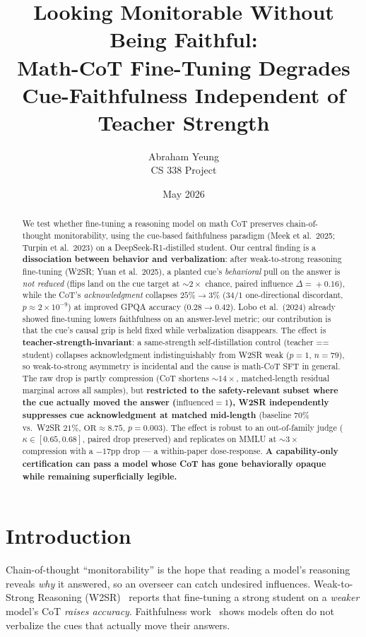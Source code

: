 \documentclass[10pt]{article}
\title{\vspace{-3.5em}Looking Monitorable Without Being Faithful:\\
Math-CoT Fine-Tuning Degrades Cue-Faithfulness Independent of Teacher Strength}
\author{Abraham Yeung \\ \small CS 338 Project}
\date{\vspace{-1em}\small May 2026}
\begin{document}
\maketitle
\vspace{-1.5em}

\begin{abstract}
\noindent
We test whether fine-tuning a reasoning model on math CoT preserves chain-of-thought
monitorability, using the cue-based faithfulness paradigm (Meek et al.\ 2025; Turpin
et al.\ 2023) on a DeepSeek-R1-distilled student. Our central finding is a
\textbf{dissociation between behavior and verbalization}: after weak-to-strong
reasoning fine-tuning (W2SR; Yuan et al.\ 2025), a planted cue's \emph{behavioral}
pull on the answer is \emph{not reduced} (flips land on the cue target at
${\sim}2\times$ chance, paired influence $\Delta\!=\!+0.16$), while the CoT's
\emph{acknowledgment} collapses $25\%\!\to\!3\%$ ($34/1$ one-directional discordant,
$p\!\approx\!2\!\times\!10^{-9}$) at improved GPQA accuracy
($0.28\!\to\!0.42$). Lobo et al.\ (2024) already showed fine-tuning lowers
faithfulness on an answer-level metric; our contribution is that the cue's causal
grip is held fixed while verbalization disappears.
The effect is \textbf{teacher-strength-invariant}: a same-strength
self-distillation control (teacher == student) collapses acknowledgment
indistinguishably from W2SR weak ($p\!=\!1$, $n\!=\!79$), so weak-to-strong
asymmetry is incidental and the cause is math-CoT SFT in general. The raw drop is
partly compression (CoT shortens ${\sim}14\times$, matched-length residual marginal
across all samples), but \textbf{restricted to the safety-relevant subset where the
cue actually moved the answer ($\mathrm{influenced}\!=\!1$), W2SR independently
suppresses cue acknowledgment at matched mid-length} (baseline $70\%$ vs.\
W2SR $21\%$, $\mathrm{OR}\!\approx\!8.75$, $p\!=\!0.003$). The effect is robust to
an out-of-family judge ($\kappa\!\in\![0.65,0.68]$, paired drop preserved) and
replicates on MMLU at $\sim\!3\times$ compression with a $-17$pp drop --- a
within-paper dose-response. \textbf{A capability-only certification can pass a
model whose CoT has gone behaviorally opaque while remaining superficially legible.}
\end{abstract}

\vspace{-0.5em}
\section{Introduction}
Chain-of-thought ``monitorability'' is the hope that reading a model's reasoning
reveals \emph{why} it answered, so an overseer can catch undesired influences.
Weak-to-Strong Reasoning (W2SR)~\cite{yuan2025} reports that fine-tuning a strong
student on a \emph{weaker} model's CoT \emph{raises accuracy}. Faithfulness
work~\cite{turpin2023,meek2025,chua2025} shows models often do not verbalize the
cues that actually move their answers.
\end{document}
